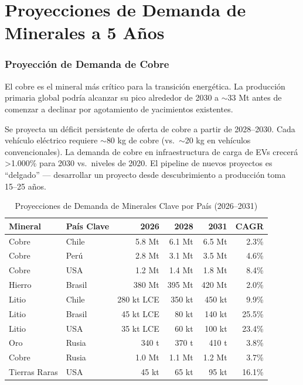 \chapter{Proyecciones de Demanda de Minerales a 5 Años}

\subsection{Proyección de Demanda de Cobre}

El cobre es el mineral más crítico para la transición energética. La producción primaria global podría alcanzar su pico alrededor de 2030 a $\sim$33 Mt antes de comenzar a declinar por agotamiento de yacimientos existentes.

\begin{keyinsightbox}
Se proyecta un déficit persistente de oferta de cobre a partir de 2028--2030. Cada vehículo eléctrico requiere $\sim$80 kg de cobre (vs.\ $\sim$20 kg en vehículos convencionales). La demanda de cobre en infraestructura de carga de EVs crecerá >1.000\% para 2030 vs.\ niveles de 2020. El pipeline de nuevos proyectos es ``delgado'' — desarrollar un proyecto desde descubrimiento a producción toma 15--25 años.
\end{keyinsightbox}

\begin{table}[htbp]
\centering
\caption{Proyecciones de Demanda de Minerales Clave por País (2026--2031)}
\begin{tabular}{@{}llrrrr@{}}
\toprule
\textbf{Mineral} & \textbf{País Clave} & \textbf{2026} & \textbf{2028} & \textbf{2031} & \textbf{CAGR} \\
\midrule
Cobre & Chile & 5.8 Mt & 6.1 Mt & 6.5 Mt & 2.3\% \\
\rowcolor{tablealt} Cobre & Perú & 2.8 Mt & 3.1 Mt & 3.5 Mt & 4.6\% \\
Cobre & USA & 1.2 Mt & 1.4 Mt & 1.8 Mt & 8.4\% \\
\rowcolor{tablealt} Hierro & Brasil & 380 Mt & 395 Mt & 420 Mt & 2.0\% \\
Litio & Chile & 280 kt LCE & 350 kt & 450 kt & 9.9\% \\
\rowcolor{tablealt} Litio & Brasil & 45 kt LCE & 80 kt & 140 kt & 25.5\% \\
Litio & USA & 35 kt LCE & 60 kt & 100 kt & 23.4\% \\
\rowcolor{tablealt} Oro & Rusia & 340 t & 370 t & 410 t & 3.8\% \\
Cobre & Rusia & 1.0 Mt & 1.1 Mt & 1.2 Mt & 3.7\% \\
\rowcolor{tablealt} Tierras Raras & USA & 45 kt & 65 kt & 95 kt & 16.1\% \\
\bottomrule
\end{tabular}
\label{tab:mineral_demand}
\end{table}

